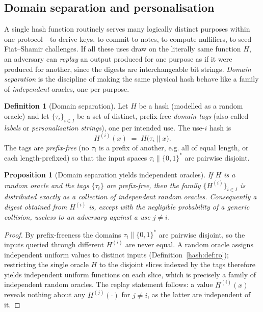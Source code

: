 \documentclass[11pt,a4paper]{article}
\newtheorem{proposition}[theorem]{Proposition}
\theoremstyle{definition}
\newtheorem{definition}[theorem]{Definition}
\theoremstyle{remark}
\begin{document}
\subsection{Domain separation and personalisation}\label{hash:sub:domainsep}

A single hash function routinely serves many logically distinct purposes within one protocol---to derive keys, to commit to notes, to compute nullifiers, to seed Fiat--Shamir challenges. If all these uses draw on the literally same function \(H\), an adversary can \emph{replay} an output produced for one purpose as if it were produced for another, since the digests are interchangeable bit strings. \emph{Domain separation} is the discipline of making the same physical hash behave like a family of \emph{independent} oracles, one per purpose.

\begin{definition}[Domain separation]\label{hash:def:domainsep}
Let \(H\) be a hash (modelled as a random oracle) and let \(\{ \tau_{i} \}_{i \in I}\) be a set of distinct, prefix-free \emph{domain tags} (also called \emph{labels} or \emph{personalisation strings}), one per intended use. The use-\(i\) hash is
\[
  H^{(i)}(x) \;=\; H\bigl( \tau_{i} \mathbin{\|} x \bigr).
\]
The tags are \emph{prefix-free} (no \(\tau_{i}\) is a prefix of another, e.g. all of equal length, or each length-prefixed) so that the input spaces \(\tau_{i} \mathbin{\|} \{0,1\}^{*}\) are pairwise disjoint.
\end{definition}

\begin{proposition}[Domain separation yields independent oracles]\label{hash:prop:domainsep}
If \(H\) is a random oracle and the tags \(\{\tau_{i}\}\) are prefix-free, then the family \(\{ H^{(i)} \}_{i \in I}\) is distributed exactly as a collection of \emph{independent} random oracles. Consequently a digest obtained from \(H^{(i)}\) is, except with the negligible probability of a generic collision, useless to an adversary against a use \(j \neq i\).
\end{proposition}

\begin{proof}
By prefix-freeness the domains \(\tau_{i} \mathbin{\|} \{0,1\}^{*}\) are pairwise disjoint, so the inputs queried through different \(H^{(i)}\) are never equal. A random oracle assigns independent uniform values to distinct inputs (Definition~\ref{hash:def:ro}); restricting the single oracle \(H\) to the disjoint slices indexed by the tags therefore yields independent uniform functions on each slice, which is precisely a family of independent random oracles. The replay statement follows: a value \(H^{(i)}(x)\) reveals nothing about any \(H^{(j)}(\cdot)\) for \(j \neq i\), as the latter are independent of it.
\end{proof}
\end{document}
